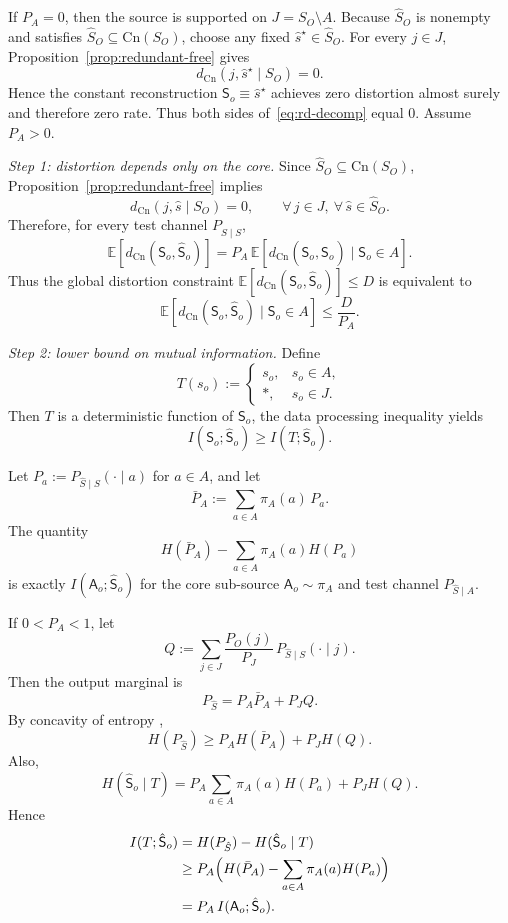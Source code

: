 \documentclass[journal,onecolumn]{IEEEtran}
\makeatletter
\newcommand{\Cn}{\text{Cn}}
\newcommand{\E}{\mathbb{E}}
\numberwithin{equation}{section}
\renewenvironment{proof}[1][\proofname]{\par
  \pushQED{\qed}%
  \normalfont \topsep6\p@\@plus6\p@\relax
  \trivlist
  \item[\hskip\labelsep
        \itshape
    #1\@addpunct{.}]\ignorespaces
}{%
  \popQED\endtrivlist\@endpefalse
}
\makeatother
\begin{document}
\begin{proof}
If \(P_A=0\), then the source is supported on \(J=S_O\setminus A\).
Because \(\hat S_O\) is nonempty and satisfies
\(\hat S_O\subseteq\Cn(S_O)\), choose any fixed
\(\hat s^\star\in\hat S_O\).
For every \(j\in J\), Proposition~\ref{prop:redundant-free} gives
\[
  d_{\Cn}(j,\hat s^\star\mid S_O)=0.
\]
Hence the constant reconstruction \(\hat {\mathsf{S}}_o\equiv\hat s^\star\)
achieves zero distortion almost surely and therefore zero rate.
Thus both sides of~\eqref{eq:rd-decomp} equal \(0\).
Assume \(P_A>0\).

\smallskip\noindent
\emph{Step 1: distortion depends only on the core.}
Since \(\hat S_O\subseteq\Cn(S_O)\), Proposition~\ref{prop:redundant-free}
implies
\[
  d_{\Cn}(j,\hat s\mid S_O)=0,
  \qquad
  \forall\,j\in J,\ \forall\,\hat s\in\hat S_O.
\]
Therefore, for every test channel \(P_{\hat S\mid S}\),
\[
  \E[d_{\Cn}({\mathsf{S}}_o,\hat {\mathsf{S}}_o)]
  =
  P_A\,
  \E[d_{\Cn}({\mathsf{S}}_o,\hat {\mathsf{S}}_o)\mid {\mathsf{S}}_o\in A].
\]
Thus the global distortion constraint
\(\E[d_{\Cn}({\mathsf{S}}_o,\hat {\mathsf{S}}_o)]\le D\)
is equivalent to
\[
  \E[d_{\Cn}({\mathsf{S}}_o,\hat {\mathsf{S}}_o)\mid {\mathsf{S}}_o\in A]
  \le
  \frac{D}{P_A}.
\]

\smallskip\noindent
\emph{Step 2: lower bound on mutual information.}
Define
\[
  T(s_o)
  :=
  \begin{cases}
    s_o, & s_o\in A,\\
    *,   & s_o\in J.
  \end{cases}
\]
Then \(T\) is a deterministic function of \({\mathsf{S}}_o\), the data processing inequality \cite[Ch.~2]{cover2006elements} yields
\[
  I({\mathsf{S}}_o;\hat {\mathsf{S}}_o)\ge I(T;\hat {\mathsf{S}}_o).
\]

Let \(P_a:=P_{\hat S\mid S}(\cdot\mid a)\) for \(a\in A\), and let
\[
  \bar P_A:=\sum_{a\in A}\pi_A(a)\,P_a.
\]
The quantity
\[
  H(\bar P_A)-\sum_{a\in A}\pi_A(a)H(P_a)
\]
is exactly
\(I(\mathsf{A}_o;\hat{\mathsf{S}}_o)\)
for the core sub-source \(\mathsf{A}_o\sim\pi_A\) and test channel
\(P_{\hat S\mid A}\).

If \(0<P_A<1\), let
\[
  Q:=\sum_{j\in J}\frac{P_O(j)}{P_J}\,
  P_{\hat S\mid S}(\cdot\mid j).
\]
Then the output marginal is
\[
  P_{\hat S}=P_A\bar P_A+P_JQ.
\]
By concavity of entropy \cite[Ch.~2]{cover2006elements}\cite[Ch.~3]{csiszar2011information},
\[
  H(P_{\hat S})\ge P_AH(\bar P_A)+P_JH(Q).
\]
Also,
\[
  H(\hat {\mathsf{S}}_o\mid T)
  =
  P_A\sum_{a\in A}\pi_A(a)H(P_a)+P_JH(Q).
\]
Hence
\begin{align*}
  I(T;\hat {\mathsf{S}}_o)
  &=H(P_{\hat S})-H(\hat {\mathsf{S}}_o\mid T) \\
  &\ge
  P_A\Bigl(
    H(\bar P_A)-\sum_{a\in A}\pi_A(a)H(P_a)
  \Bigr) \\
  &= P_A\,I(\mathsf{A}_o;\hat{\mathsf{S}}_o).
\end{align*}


\end{proof}
\end{document}
